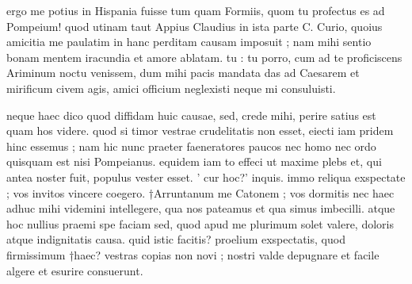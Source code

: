 


 ergo me potius in Hispania fuisse tum quam Formiis, quom tu profectus es ad Pompeium! quod utinam taut Appius Claudius in ista parte C. Curio, quoius amicitia me paulatim in hanc perditam causam imposuit ; nam mihi sentio bonam mentem iracundia et amore ablatam. tu : tu porro, cum ad te proficiscens Ariminum noctu venissem, dum mihi pacis mandata das ad Caesarem et mirificum civem agis, amici officium neglexisti neque mi consuluisti.

 neque haec dico quod diffidam huic causae, sed, crede mihi, perire satius est quam hos videre. quod si timor vestrae crudelitatis non esset, eiecti iam pridem hinc essemus ; nam hic nunc praeter faeneratores paucos nec homo nec ordo quisquam est nisi Pompeianus. equidem iam to effeci ut maxime plebs et, qui antea noster fuit, populus vester esset. ' cur hoc?' inquis. immo reliqua exspectate ; vos invitos vincere coegero. †Arruntanum me Catonem ; vos dormitis nec haec adhuc mihi videmini intellegere, qua nos pateamus et qua simus imbecilli. atque hoc nullius praemi spe faciam sed, quod apud me plurimum solet valere, doloris atque indignitatis causa. quid istic facitis? proelium exspectatis, quod firmissimum †haec? vestras copias non novi ; nostri valde depugnare et facile algere et esurire consuerunt.
